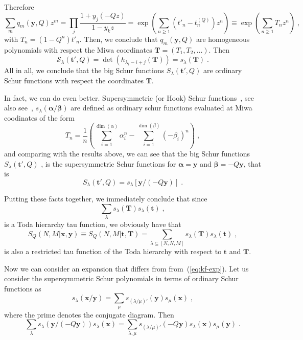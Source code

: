 \documentclass[a4paper,11pt]{amsart}
\begin{document}
Therefore 
\begin{equation}
 \sum_{m} q_m(\bm{y}, Q) z^m =
 \prod_j \frac{1 + y_j (-Q z)}{1 - y_k z}
 = \exp \left( \sum_{n\geq 1} (t'_n - t_n^{(Q)})z^n \right)
 \equiv \exp \left( \sum_{n\geq 1} T_n z^n \right)\; ,
\end{equation}
with \(T_n = (1 - Q^n) t'_n\). Then, we conclude that \(q_m(\bm{y}, Q)\)
are homogeneous polynomials with respect the Miwa coordinates
\(\bm{T} = (T_1, T_2, \dots)\). Then
\begin{equation}
  \mathcal{S}_\lambda(\bm{t}', Q) = \det \left(h_{\lambda_i - i +j}(\bm{T})\right) = s_\lambda(\bm{T})\; .
\end{equation}
All in all, we conclude that the big Schur functions
\(S_\lambda(\bm{t}', Q)\) are ordinary Schur functions with respect
the coordinates \(\bm{T}\).

In fact, we can do even better. Supersymmetric (or Hook) Schur
functions~\cite{Berele:1983}, see also see~\cite{Macdonald:1998, Moens:2003},
\(s_\lambda(\bm{\alpha}/\bm{\beta})\) are defined as ordinary schur
functions evaluated at Miwa coodinates of the form
\begin{equation}
  T_n = \frac{1}{n} \left( \sum_{i=1}^{\dim(\alpha)} \alpha_i^n
       - \sum_{i=1}^{\dim(\beta)} (-\beta_i)^n\right)\; ,
\end{equation}
and comparing with the results above, we can see that the big Schur functions
\(S_\lambda(\bm{t}', Q)\)\; , is the supersymmetric Schur functions for \(\bm{\alpha} = \bm{y}\) 
and \(\bm{\beta} = - Q \bm{y}\), that is 
\begin{equation}
  S_\lambda(\bm{t}', Q) = s_\lambda[\bm{y}/(- Q\bm{y})]\; .
\end{equation}

Putting these facts together, we immediately conclude that since 
\begin{equation}
  \sum_\lambda s_\lambda(\bm{T}) s_\lambda (\bm{t}) \; ,
\end{equation}
is a Toda hierarchy tau function, we obviously have that 
\begin{equation}
  S_Q(N,M| \bm{x}, \bm{y}) \equiv S_Q(N,M| \bm{t}, \bm{T})
  = \sum_{\lambda \subseteq [N,N,M]} s_\lambda(\bm{T}) s_\lambda(\bm{t})\; , 
\end{equation}
is also a restricted tau function of the Toda hierarchy with respect
to \(\bm{t}\) and \(\bm{T}\).

Now we can consider an expansion that differs from
from~(\ref{eq:kf-exp}). Let us consider the supersymmetric Schur
polynomials in terms of ordinary Schur functions as~\cite[Sec. I.5,
  exerc. 23]{Macdonald:1998}
\begin{equation}
  s_{\lambda}(\bm{x}/\bm{y}) = \sum_\mu s_{(\lambda/\mu)'}(\bm{y}) s_\mu(\bm{x})\; ,
\end{equation}
where the prime denotes the conjugate diagram. Then
\begin{equation}
  \label{eq:tau-hl}
  \sum_{\lambda } s_\lambda(\bm{y}/ (- Q\bm{y})) s_\lambda(\bm{x}) =
  \sum_{\lambda,\mu } s_{(\lambda/\mu)'}(- Q\bm{y}) s_\lambda(\bm{x}) s_\mu(\bm{y})\; .
\end{equation}
\end{document}
